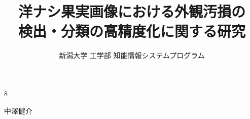 



\begin{toppage}
  \title{洋ナシ果実画像における外観汚損の\\検出・分類の高精度化に関する研究}{8}


  \author{新潟大学 工学部 知能情報システムプログラム }{中澤健介}
\end{toppage}



\contents








